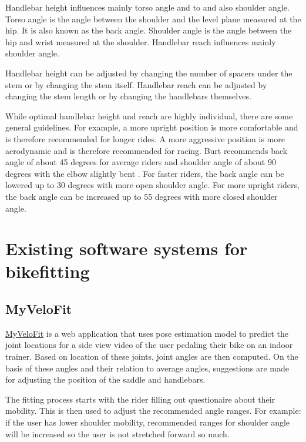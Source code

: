 Handlebar height influences mainly torso angle and to and also shoulder angle. Torso angle is the angle between the shoulder and the level plane measured at the hip. It is also known as the back angle. Shoulder angle is the angle between the hip and wrist measured at the shoulder. Handlebar reach influences mainly shoulder angle.

Handlebar height can be adjusted by changing the number of spacers under the stem or by changing the stem itself. Handlebar reach can be adjusted by changing the stem length or by changing the handlebars themselves.

While optimal handlebar height and reach are highly individual, there are some general guidelines. For example, a more upright position is more comfortable and is therefore recommended for longer rides. A more aggressive position is more aerodynamic and is therefore recommended for racing. Burt recommends back angle of about 45 degrees for average riders and shoulder angle of about 90 degrees with the elbow slightly bent \cite{burtbikefit}. For faster riders, the back angle can be lowered up to 30 degrees with more open shoulder angle. For more upright riders, the back angle can be increased up to 55 degrees with more closed shoulder angle.



\section{Existing software systems for bikefitting}

\subsection{MyVeloFit}
\href{https://www.myvelofit.com/}{MyVeloFit}  is a web application that uses pose estimation model to predict the joint locations for a side view video of the user pedaling their bike on an indoor trainer. Based on location of these joints, joint angles are then computed. On the basis of these angles and their relation to average angles, suggestions are made for adjusting the position of the saddle and handlebars.

The fitting process starts with the rider filling out questionaire about their mobility. This is then used to adjust the recommended angle ranges. For example: if the user has lower shoulder mobility, recommended ranges for shoulder angle will be increased so the user is not stretched forward so much.

